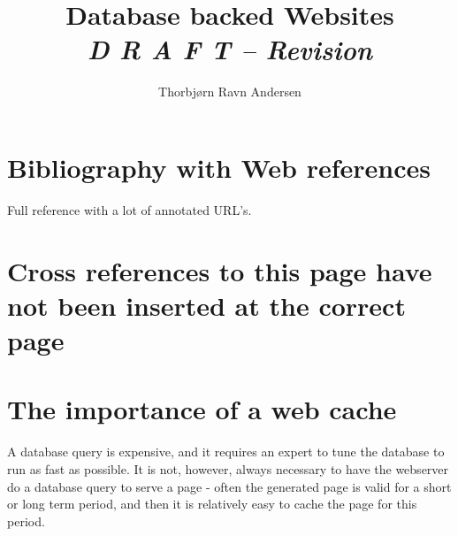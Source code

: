 \documentclass[11pt,draft,a4paper]{book}
\author{Thorbj{\o}rn Ravn Andersen}
\title{Database backed Websites \\
  \textit{D R A F T -- $ $Revision$ $}} %
\begin{document}
\appendix
{}



\section{Bibliography with Web references}
Full reference with a lot of annotated URL's.





\tableofcontents

\section{Cross references to this page have not been inserted at the
  correct page}

\label{fig:slashdot-1}
\label{sec:CGI-modperl}
\label{sec:CGI-php3}
\label{sec:CGI-servlets}
\label{fig:mip-recently-changed-pages}
\label{sec:html-meta-tags}
\label{cha:on-demand-rendering}
\label{sec:emacs-with-psgml}
\label{sec:java-servlets}

\section{The importance of a web cache}
\label{sec:the-importance-of-a-web-cache}

A database query is expensive, and it requires an expert to tune the
database to run as fast as possible.  It is not, however, always
necessary to have the webserver do a database query to serve a page -
often the generated page is valid for a short or long term period,
and then it is relatively easy to cache the page for this period.
\end{document}
